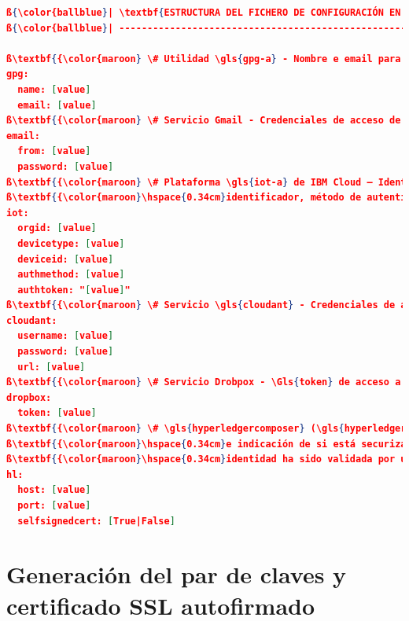 \documentclass[12pt,a4paper, twoside]{report}
\begin{document}
\begin{lstlisting}[language=json, basicstyle=\ttfamily\footnotesize, numbers=none, escapechar=ß]
ß{\color{ballblue}| \textbf{ESTRUCTURA DEL FICHERO DE CONFIGURACIÓN EN FORMATO \gls{yaml-a}}}ß
ß{\color{ballblue}| -------------------------------------------------------}ß

ß\textbf{{\color{maroon} \# Utilidad \gls{gpg-a} - Nombre e email para asociar a las claves generadas}}ß
gpg:
  name: [value]
  email: [value]
ß\textbf{{\color{maroon} \# Servicio Gmail - Credenciales de acceso de la dirección de correo desde donde se envían \textit{emails}}}ß
email:
  from: [value]
  password: [value]
ß\textbf{{\color{maroon} \# Plataforma \gls{iot-a} de IBM Cloud – Identificador de organización, tipo de dispositivo e}}ß
ß\textbf{{\color{maroon}\hspace{0.34cm}identificador, método de autenticación y \gls{token} de acceso}}ß
iot:
  orgid: [value]
  devicetype: [value]
  deviceid: [value]
  authmethod: [value]
  authtoken: "[value]"
ß\textbf{{\color{maroon} \# Servicio \gls{cloudant} - Credenciales de acceso y \gls{url-a}}}ß
cloudant:
  username: [value]
  password: [value]
  url: [value]
ß\textbf{{\color{maroon} \# Servicio Drobpox - \Gls{token} de acceso a la cuenta de Dropbox}}ß
dropbox:
  token: [value]
ß\textbf{{\color{maroon} \# \gls{hyperledgercomposer} (\gls{hyperledgercomposer-a}) - Dirección IP y puerto donde está desplegado el servidor \gls{rest-a} \gls{api-a}}}ß
ß\textbf{{\color{maroon}\hspace{0.34cm}e indicación de si está securizado con un \gls{certautofirmado} o con un certificado cuya}}ß
ß\textbf{{\color{maroon}\hspace{0.34cm}identidad ha sido validada por una autoridad certificadora (\textit{\gls{ca}} -\gls{ca-a}-)\footnote{Esta propiedad es especificada para saltar el paso de verificación del certificado en las peticiones \gls{https-a} ya que si se usa un \gls{certautofirmado} al no ser capaz de verificar la identidad, la petición es denegada. En caso de usar un certificado validado por una \gls{ca-a}, la verificación se habilita. Consultar \cite{python:requests} para obtener más información.}}}ß
hl:
  host: [value]
  port: [value]
  selfsignedcert: [True|False]
\end{lstlisting}
	
	\section{Generación del par de claves y certificado SSL autofirmado}
	
\end{document}
